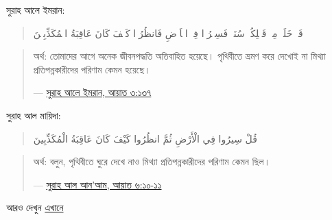 \documentclass[
]{book}
\begin{document}
সুরাহ আলে ইমরান:

\begin{quote}
قَدۡ خَلَتۡ مِنۡ قَبۡلِكُمۡ سُنَنٌۙ فَسِيۡرُوۡا فِىۡ الۡاَرۡضِ فَانظُرُوۡا كَيۡفَ كَانَ عَاقِبَةُ الۡمُكَذِّبِيۡنَ
\end{quote}

\begin{quote}
অর্থ: তোমাদের আগে অনেক জীবনপদ্ধতি অতিবাহিত হয়েছে। পৃথিবীতে ভ্রমণ করে দেখোই না মিথ্যা প্রতিপন্নকারীদের পরিণাম কেমন হয়েছে।

--- \href{https://tanzil.net/\#3:137}{সুরাহ আলে ইমরান, আয়াত ৩:১৩৭}
\end{quote}

সুরাহ আল মায়িদা:

\begin{quote}
قُلْ سِيرُوا فِي الْأَرْضِ ثُمَّ انظُرُوا كَيْفَ كَانَ عَاقِبَةُ الْمُكَذِّبِينَ
\end{quote}

\begin{quote}
অর্থ: বলুন, পৃথিবীতে ঘুরে দেখে নাও মিথ্যা প্রতিপন্নকারীদের পরিণাম কেমন ছিল।

--- \href{https://tanzil.net/\#6:11}{সুরাহ আল আন'আম, আয়াত ৬:১০-১১}
\end{quote}

আরও দেখুন \href{https://alomoy.github.io/islam/travelling.al}{এখানে}
\end{document}
